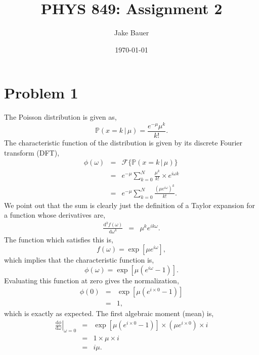 \documentclass[12pt]{article}
\begin{document}
\title{PHYS 849: Assignment 2}
\author{Jake Bauer}
\date{\today}
\maketitle

\section*{Problem 1}
The Poisson distribution is given as,
\begin{equation}
\mathbb{P}(x = k \,| \,\mu) = \frac{e^{-\mu} \mu^k}{k!}.
\end{equation}
The characteristic function of the distribution is given by its discrete Fourier transform (DFT),
\begin{eqnarray}
\phi(\omega) &=& \mathcal{F}\{\mathbb{P}(x = k \,| \,\mu) \}\\
&=& e^{-\mu} \sum_{k=0}^{N} \frac{ \mu^k}{k!} \times e^{ i \omega k}\\
&=&  e^{-\mu} \sum_{k=0}^{N} \frac{\left( \mu e^{i \omega}\right)^k}{k!}.
\end{eqnarray}
We point out that the sum is clearly just the definition of a Taylor expansion for a function whose derivatives are,
\begin{eqnarray}
\frac{\text{d}^k f(\omega)}{\text{d} \omega^k} &=& \mu^k e^{ i k \omega}.
\end{eqnarray}
The function which satisfies this is,
\begin{equation}
f(\omega) = \exp\left[ {\mu} e^{ i\omega}\right],
\end{equation}
which implies that the characteristic function is,
\begin{equation}
\phi(\omega) = \exp\left[ \mu \left( e^{i \omega}- 1\right)\right].
\end{equation}
Evaluating this function at zero gives the normalization,
\begin{eqnarray}
\phi(0) &=& \exp\left[ \mu \left( e^{i \times 0} - 1\right)\right]\\
&=& 1,
\end{eqnarray}
which is exactly as expected. The first algebraic moment (mean) is,
\begin{eqnarray}
\left. \frac{\text{d} \phi}{\text{d} \omega} \right \vert_{\omega = 0} &=& \exp\left[ \mu \left( e^{i \times 0 } - 1\right)\right] \times \left(\mu e^{ i \times 0 }  \right) \times i\\
&=& 1 \times \mu \times i\\
&=& i \mu.
\end{eqnarray}
\end{document}
